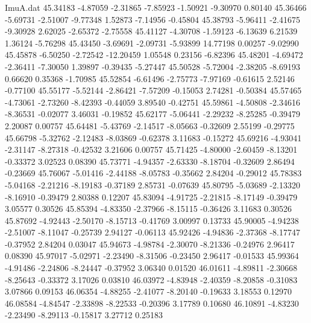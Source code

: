 \begin{filecontents}{ImuA.dat}
  45.34183   -4.87059   -2.31865   -7.85923   -1.50921   -9.30970    0.80140
  45.36466   -5.69731   -2.51007   -9.77348    1.52873   -7.14956   -0.45804
  45.38793   -5.96411   -2.41675   -9.30928    2.62025   -2.65372   -2.75558
  45.41127   -4.30708   -1.59123   -6.13639    6.21539    1.36124   -5.76298
  45.43450   -3.69691   -2.09731   -5.93899   14.77198    0.00257   -9.02990
  45.45878   -6.50250   -2.72542  -12.20459    1.05548    0.23156   -6.82396
  45.48201   -4.69472   -2.36411   -7.30050    1.39897   -0.39435   -5.27447
  45.50528   -5.72004   -2.38205   -8.69193    0.66620    0.35368   -1.70985
  45.52854   -6.61496   -2.75773   -7.97169   -0.61615    2.52146   -0.77100
  45.55177   -5.52144   -2.86421   -7.57209   -0.15053    2.74281   -0.50384
  45.57465   -4.73061   -2.73260   -8.42393   -0.44059    3.89540   -0.42751
  45.59861   -4.50808   -2.34616   -8.36531   -0.02077    3.46031   -0.19852
  45.62177   -5.06441   -2.29232   -8.25285   -0.39479    2.20087    0.00757
  45.64481   -5.43769   -2.14517   -8.05663   -0.32609    2.55199   -0.29775
  45.66798   -5.32762   -2.12483   -8.03869   -0.62378    3.11683   -0.15272
  45.69216   -4.93041   -2.31147   -8.27318   -0.42532    3.21606    0.00757
  45.71425   -4.80000   -2.60459   -8.13201   -0.33372    3.02523    0.08390
  45.73771   -4.94357   -2.63330   -8.18704   -0.32609    2.86494   -0.23669
  45.76067   -5.01416   -2.44188   -8.05783   -0.35662    2.84204   -0.29012
  45.78383   -5.04168   -2.21216   -8.19183   -0.37189    2.85731   -0.07639
  45.80795   -5.03689   -2.13320   -8.16910   -0.39479    2.80388    0.12207
  45.83094   -4.91725   -2.21815   -8.17149   -0.39479    3.05577    0.30526
  45.85394   -4.83350   -2.37966   -8.15115   -0.36426    3.11683    0.30526
  45.87692   -4.92443   -2.50170   -8.15713   -0.41769    3.00997    0.13733
  45.90005   -4.94238   -2.51007   -8.11047   -0.25739    2.94127   -0.06113
  45.92426   -4.94836   -2.37368   -8.17747   -0.37952    2.84204    0.03047
  45.94673   -4.98784   -2.30070   -8.21336   -0.24976    2.96417    0.08390
  45.97017   -5.02971   -2.23490   -8.31506   -0.23450    2.96417   -0.01533
  45.99364   -4.91486   -2.24806   -8.24447   -0.37952    3.06340    0.01520
  46.01611   -4.89811   -2.30668   -8.25643   -0.33372    3.17026    0.03810
  46.03972   -4.83948   -2.40359   -8.20858   -0.31083    3.07866    0.09153
  46.06354   -4.88255   -2.41077   -8.20140   -0.19633    3.18553    0.12970
  46.08584   -4.84547   -2.33898   -8.22533   -0.20396    3.17789    0.10680
  46.10891   -4.83230   -2.23490   -8.29113   -0.15817    3.27712    0.25183

\end{filecontents}
